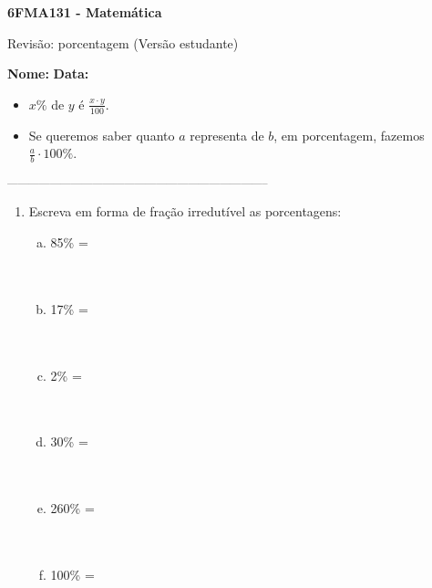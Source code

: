 \documentclass[a4paper,14pt]{article}
\begin{document}
	
	\noindent\textbf{6FMA131 - Matemática} 
	
	\begin{center}Revisão: porcentagem (Versão estudante)
	\end{center}
	
	\noindent\textbf{Nome:} \underline{\hspace{10cm}}
	\noindent\textbf{Data:} \underline{\hspace{4cm}}
	
	
	\begin{multicols}{2}
	    \noindent 
	    \begin{itemize}
	    	\item $x\%$ de $y$ é $\frac{x \cdot y}{100}$.
	    	\item Se queremos saber quanto $a$ representa de $b$, em porcentagem, fazemos $\frac{a}{b} \cdot 100\%$.
	    \end{itemize}
		\noindent\textsubscript{--------------------------------------------------------------------------}
		\begin{enumerate} 
			\item Escreva em forma de fração irredutível as porcentagens:
			\begin{enumerate}[a)] 
				\item 85\% = \\\\\\
				\item 17\% = \\\\\\
				\item 2\% = \\\\\\
				\item 30\% = \\\\\\
				\item 260\% = \\\\\\
				\item 100\% = \\\\\\

\end{enumerate}
\end{enumerate}
\end{multicols}
\end{document}
